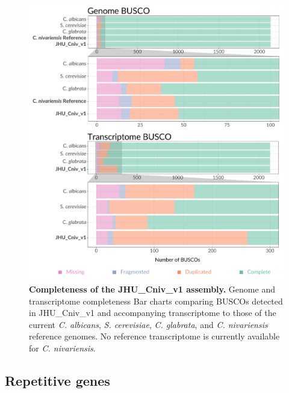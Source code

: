 \begin{figure}[!ht]
\centering
\includegraphics[width = 1\linewidth,keepaspectratio]{figure/busco.pdf}
\caption[Completeness of the JHU\_Cniv\_v1 assembly]{{\bf Completeness of the JHU\_Cniv\_v1 assembly.} Genome and transcriptome completeness Bar charts comparing BUSCOs detected in JHU\_Cniv\_v1 and accompanying transcriptome to those of the current \textit{C. albicans}, \textit{S. cerevisiae}, \textit{C. glabrata}, and \textit{C. nivariensis} reference genomes. No reference transcriptome is currently available for \textit{C. nivariensis}. }
\label{fig:busco}
\end{figure}


\subsection{Repetitive genes}
\label{sec:repgenes}


